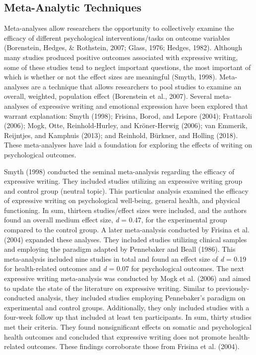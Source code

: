 \documentclass[man, mask]{apa6}
\newcounter{author}
\theoremstyle{definition}
\theoremstyle{definition}
\theoremstyle{definition}
\theoremstyle{remark}
\begin{document}
\subsection{Meta-Analytic Techniques}\label{meta-analytic-techniques}

Meta-analyses allow researchers the opportunity to collectively examine
the efficacy of different psychological interventions/tasks on outcome
variables (Borenstein, Hedges, \& Rothstein, 2007; Glass, 1976; Hedges,
1982). Although many studies produced positive outcomes associated with
expressive writing, some of these studies tend to neglect important
questions, the most important of which is whether or not the effect
sizes are meaningful (Smyth, 1998). Meta-analyses are a technique that
allows researchers to pool studies to examine an overall, weighted,
population effect (Borenstein et al., 2007). Several meta-analyses of
expressive writing and emotional expression have been explored that
warrant explanation: Smyth (1998); Frisina, Borod, and Lepore (2004);
Frattaroli (2006); Mogk, Otte, Reinhold-Hurley, and Kröner-Herwig
(2006); van Emmerik, Reijntjes, and Kamphuis (2013); and Reinhold,
Bürkner, and Holling (2018). These meta-analyses have laid a foundation
for exploring the effects of writing on psychological outcomes.

Smyth (1998) conducted the seminal meta-analysis regarding the efficacy
of expressive writing. They included studies utilizing an expressive
writing group and control group (neutral topic). This particular
analysis examined the efficacy of expressive writing on psychological
well-being, general health, and physical functioning. In sum, thirteen
studies/effect sizes were included, and the authors found an overall
medium effect size, \emph{d} = 0.47, for the experimental group compared
to the control group. A later meta-analysis conducted by Frisina et al.
(2004) expanded these analyses. They included studies utilizing clinical
samples and employing the paradigm adapted by Pennebaker and Beall
(1986). This meta-analysis included nine studies in total and found an
effect size of \emph{d} = 0.19 for health-related outcomes and \emph{d}
= 0.07 for psychological outcomes. The next expressive writing
meta-analysis was conducted by Mogk et al. (2006) and aimed to update
the state of the literature on expressive writing. Similar to
previously-conducted analysis, they included studies employing
Pennebaker's paradigm on experimental and control groups. Additionally,
they only included studies with a four-week follow up that included at
least ten participants. In sum, thirty studies met their criteria. They
found nonsignificant effects on somatic and psychological health
outcomes and concluded that expressive writing does not promote
health-related outcomes. These findings corroborate those from Frisina
et al. (2004).
\end{document}
